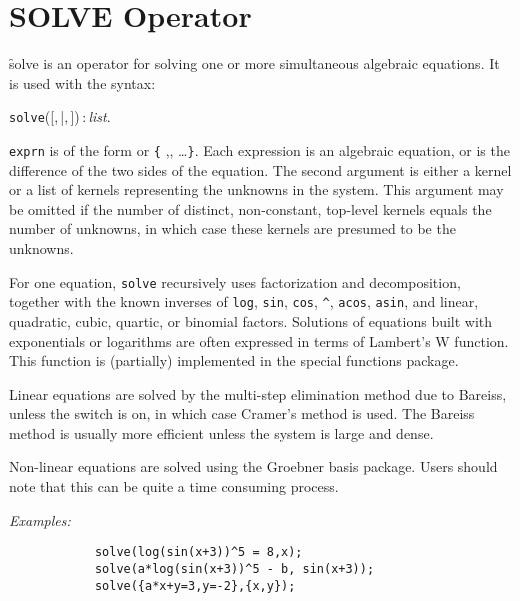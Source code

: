 \section{SOLVE Operator}
\hypertarget{operator:SOLVE}{}
\f{solve} is an operator for solving one or more simultaneous algebraic
equations. It is used with the syntax:
\begin{syntax}
  \texttt{solve}([,\,|,\,])\,:\,\textit{list}.
\end{syntax}
\texttt{exprn} is of the form  or
\texttt{\{} ,, \dots \texttt{\}}.
Each expression is an
algebraic equation, or is the difference of the two sides of the equation.
The second argument is either a kernel or a list of kernels representing
the unknowns in the system.  This argument may be omitted if the number of
distinct, non-constant, top-level kernels equals the number of unknowns,
in which case these kernels are presumed to be the unknowns.

For one equation, \texttt{solve} recursively uses
factorization and decomposition, together with the known inverses of
\texttt{log}, \texttt{sin}, \texttt{cos}, \texttt{\textasciicircum},
\texttt{acos}, \texttt{asin}, and
linear, quadratic, cubic, quartic, or binomial factors. Solutions
of equations built with exponentials or logarithms are often
expressed in terms of Lambert's W function.
This function is (partially) implemented in the special functions package.

Linear equations are solved by the multi-step elimination method due to
Bareiss, unless the switch  is on, in which
case Cramer's method is used.  The Bareiss method is usually more
efficient unless the system is large and dense.

Non-linear equations are solved using the Groebner basis
package.
Users should note that this
can be quite a time consuming process.

\textit{Examples:}
\begin{verbatim}
            solve(log(sin(x+3))^5 = 8,x);
            solve(a*log(sin(x+3))^5 - b, sin(x+3));
            solve({a*x+y=3,y=-2},{x,y});
\end{verbatim}


